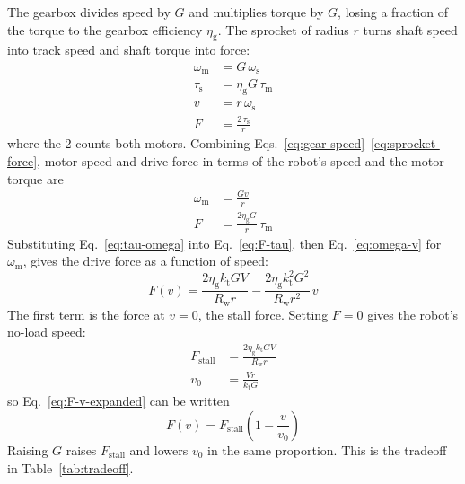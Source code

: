 The gearbox divides speed by $G$ and multiplies torque by $G$, losing a fraction of the torque to the gearbox efficiency $\eta_\mathrm{g}$. The sprocket of radius $r$ turns shaft speed into track speed and shaft torque into force:
\begin{align}
  \omega_\mathrm{m} &= G\, \omega_\mathrm{s} \label{eq:gear-speed} \\
  \tau_\mathrm{s} &= \eta_\mathrm{g} G\, \tau_\mathrm{m} \label{eq:gear-torque} \\
  v &= r\, \omega_\mathrm{s} \label{eq:sprocket-speed} \\
  F &= \frac{2\, \tau_\mathrm{s}}{r} \label{eq:sprocket-force}
\end{align}
where the 2 counts both motors. Combining Eqs.~\eqref{eq:gear-speed}--\eqref{eq:sprocket-force}, motor speed and drive force in terms of the robot's speed and the motor torque are
\begin{align}
  \omega_\mathrm{m} &= \frac{G v}{r} \label{eq:omega-v} \\
  F &= \frac{2 \eta_\mathrm{g} G}{r}\, \tau_\mathrm{m} \label{eq:F-tau}
\end{align}
Substituting Eq.~\eqref{eq:tau-omega} into Eq.~\eqref{eq:F-tau}, then Eq.~\eqref{eq:omega-v} for $\omega_\mathrm{m}$, gives the drive force as a function of speed:
\begin{equation}
  F(v) = \frac{2 \eta_\mathrm{g} k_\mathrm{t} G V}{R_\mathrm{w} r} - \frac{2 \eta_\mathrm{g} k_\mathrm{t}^2 G^2}{R_\mathrm{w} r^2}\, v
  \label{eq:F-v-expanded}
\end{equation}
The first term is the force at $v = 0$, the stall force. Setting $F = 0$ gives the robot's no-load speed:
\begin{align}
  F_\mathrm{stall} &= \frac{2 \eta_\mathrm{g} k_\mathrm{t} G V}{R_\mathrm{w} r} \label{eq:fstall} \\
  v_0 &= \frac{V r}{k_\mathrm{t} G} \label{eq:v0}
\end{align}
so Eq.~\eqref{eq:F-v-expanded} can be written
\begin{equation}
  F(v) = F_\mathrm{stall}\left(1 - \frac{v}{v_0}\right)
  \label{eq:motor}
\end{equation}
Raising $G$ raises $F_\mathrm{stall}$ and lowers $v_0$ in the same proportion. This is the tradeoff in Table~\ref{tab:tradeoff}.

